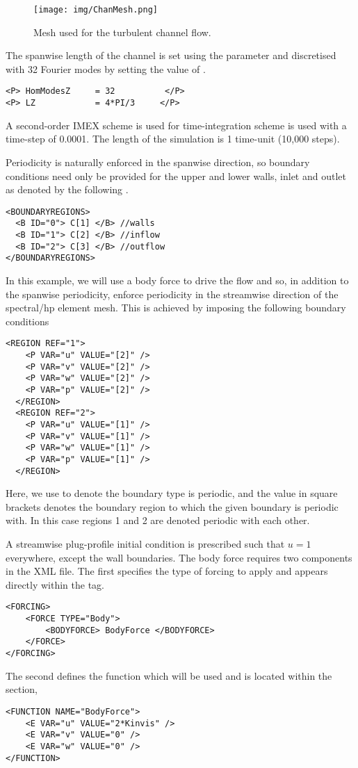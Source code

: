 \begin{figure}
\begin{center}
\texttt{[image: img/ChanMesh.png]}
\caption{Mesh used for the turbulent channel flow.}
\label{f:incns:turbchanmesh}
\end{center}
\end{figure}

The spanwise length of the channel is set using the  parameter and
discretised with 32 Fourier modes by setting the value of .
\begin{lstlisting}[style=XMLStyle]
<P> HomModesZ     = 32          </P>
<P> LZ            = 4*PI/3     </P>
\end{lstlisting}
A second-order IMEX scheme is used for time-integration scheme is used with a
time-step of 0.0001. The length of the simulation is 1 time-unit (10,000 steps).

Periodicity is naturally enforced in the spanwise direction, so boundary
conditions need only be provided for the upper and lower walls, inlet and
outlet as denoted by the following .
\begin{lstlisting}[style=XmlStyle]
<BOUNDARYREGIONS>
  <B ID="0"> C[1] </B> //walls
  <B ID="1"> C[2] </B> //inflow
  <B ID="2"> C[3] </B> //outflow
</BOUNDARYREGIONS>
\end{lstlisting}
In this example, we will use a body force to drive the flow and so, in addition
to the spanwise periodicity, enforce periodicity in the streamwise direction of
the spectral/hp element mesh. This is achieved by imposing the following
boundary conditions
\begin{lstlisting}[style=XMLStyle]
  <REGION REF="1">
    <P VAR="u" VALUE="[2]" />
    <P VAR="v" VALUE="[2]" />
    <P VAR="w" VALUE="[2]" />
    <P VAR="p" VALUE="[2]" />
  </REGION>
  <REGION REF="2">
    <P VAR="u" VALUE="[1]" />
    <P VAR="v" VALUE="[1]" />
    <P VAR="w" VALUE="[1]" />
    <P VAR="p" VALUE="[1]" />
  </REGION>
\end{lstlisting}
Here, we use  to denote the boundary type is periodic, and the value in
square brackets denotes the boundary region to which the given boundary is
periodic with. In this case regions 1 and 2 are denoted periodic with each
other.

A streamwise plug-profile initial condition is prescribed such that $u=1$
everywhere, except the wall boundaries. The body force requires two components
in the XML file. The first specifies the type of forcing to apply and appears
directly within the  tag.
\begin{lstlisting}[style=XMLStyle]
<FORCING>
    <FORCE TYPE="Body">
        <BODYFORCE> BodyForce </BODYFORCE>
    </FORCE>
</FORCING>
\end{lstlisting}
The second defines the  function which will be used and is
located within the  section,
\begin{lstlisting}[style=XMLStyle]
<FUNCTION NAME="BodyForce">
    <E VAR="u" VALUE="2*Kinvis" />
    <E VAR="v" VALUE="0" />
    <E VAR="w" VALUE="0" />
</FUNCTION>
\end{lstlisting}

